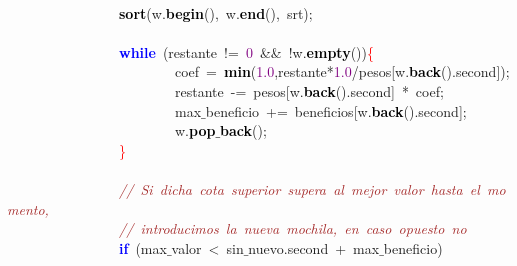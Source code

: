 \mbox{} \\
\mbox{}\ \ \ \ \ \ \ \ \ \ \ \ \ \ \ \ \textbf{\textcolor{Black}{sort}}\textcolor{BrickRed}{(}w\textcolor{BrickRed}{.}\textbf{\textcolor{Black}{begin}}\textcolor{BrickRed}{(),}\ w\textcolor{BrickRed}{.}\textbf{\textcolor{Black}{end}}\textcolor{BrickRed}{(),}\ srt\textcolor{BrickRed}{);} \\
\mbox{} \\
\mbox{}\ \ \ \ \ \ \ \ \ \ \ \ \ \ \ \ \textbf{\textcolor{Blue}{while}}\ \textcolor{BrickRed}{(}restante\ \textcolor{BrickRed}{!=}\ \textcolor{Purple}{0}\ \textcolor{BrickRed}{\&\&}\ \textcolor{BrickRed}{!}w\textcolor{BrickRed}{.}\textbf{\textcolor{Black}{empty}}\textcolor{BrickRed}{())}\textcolor{Red}{\{} \\
\mbox{}\ \ \ \ \ \ \ \ \ \ \ \ \ \ \ \ \ \ \ \ \ \ \ \ coef\ \textcolor{BrickRed}{=}\ \textbf{\textcolor{Black}{min}}\textcolor{BrickRed}{(}\textcolor{Purple}{1.0}\textcolor{BrickRed}{,}restante\textcolor{BrickRed}{*}\textcolor{Purple}{1.0}\textcolor{BrickRed}{/}pesos\textcolor{BrickRed}{[}w\textcolor{BrickRed}{.}\textbf{\textcolor{Black}{back}}\textcolor{BrickRed}{().}second\textcolor{BrickRed}{]);} \\
\mbox{}\ \ \ \ \ \ \ \ \ \ \ \ \ \ \ \ \ \ \ \ \ \ \ \ restante\ \textcolor{BrickRed}{-=}\ pesos\textcolor{BrickRed}{[}w\textcolor{BrickRed}{.}\textbf{\textcolor{Black}{back}}\textcolor{BrickRed}{().}second\textcolor{BrickRed}{]}\ \textcolor{BrickRed}{*}\ coef\textcolor{BrickRed}{;} \\
\mbox{}\ \ \ \ \ \ \ \ \ \ \ \ \ \ \ \ \ \ \ \ \ \ \ \ max$\_$beneficio\ \textcolor{BrickRed}{+=}\ beneficios\textcolor{BrickRed}{[}w\textcolor{BrickRed}{.}\textbf{\textcolor{Black}{back}}\textcolor{BrickRed}{().}second\textcolor{BrickRed}{];} \\
\mbox{}\ \ \ \ \ \ \ \ \ \ \ \ \ \ \ \ \ \ \ \ \ \ \ \ w\textcolor{BrickRed}{.}\textbf{\textcolor{Black}{pop$\_$back}}\textcolor{BrickRed}{();} \\
\mbox{}\ \ \ \ \ \ \ \ \ \ \ \ \ \ \ \ \textcolor{Red}{\}} \\
\mbox{} \\
\mbox{}\ \ \ \ \ \ \ \ \ \ \ \ \ \ \ \ \textit{\textcolor{Brown}{//\ Si\ dicha\ cota\ superior\ supera\ al\ mejor\ valor\ hasta\ el\ momento,}} \\
\mbox{}\ \ \ \ \ \ \ \ \ \ \ \ \ \ \ \ \textit{\textcolor{Brown}{//\ introducimos\ la\ nueva\ mochila,\ en\ caso\ opuesto\ no}} \\
\mbox{}\ \ \ \ \ \ \ \ \ \ \ \ \ \ \ \ \textbf{\textcolor{Blue}{if}}\ \textcolor{BrickRed}{(}max$\_$valor\ \textcolor{BrickRed}{\textless{}}\ sin$\_$nuevo\textcolor{BrickRed}{.}second\ \textcolor{BrickRed}{+}\ max$\_$beneficio\textcolor{BrickRed}{)} \\
